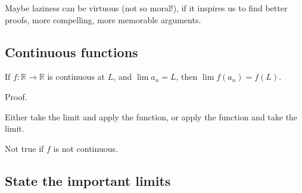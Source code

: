 \documentclass[12pt]{article}
\newcommand{\R}{\mathbb{R}}
\begin{document}
Maybe laziness can be virtuous (not so moral!), if it inspires us to
find better proofs, more compelling, more memorable arguments.

\subsection{Continuous functions}

If $f : \R \to \R$ is continuous at $L$, and $\lim a_n = L$, then
$\lim f(a_n) = f(L)$.

Proof.

Either take the limit and apply the function, or apply the function
and take the limit.

Not true if $f$ is not continuous.

\subsection{State the important limits}
\end{document}
